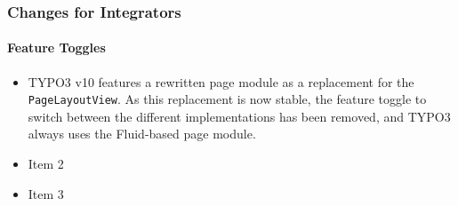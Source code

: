 %

\begin{frame}[fragile]
	\frametitle{Changes for Integrators}
	\framesubtitle{Feature Toggles}

	\begin{itemize}
		\item TYPO3 v10 features a rewritten page module as a replacement for the \texttt{PageLayoutView}.
			As this replacement is now stable, the feature toggle to switch between the
			different implementations has been removed, and TYPO3 always uses the Fluid-based
			page module.
		\item Item 2
		\item Item 3
	\end{itemize}

\end{frame}

